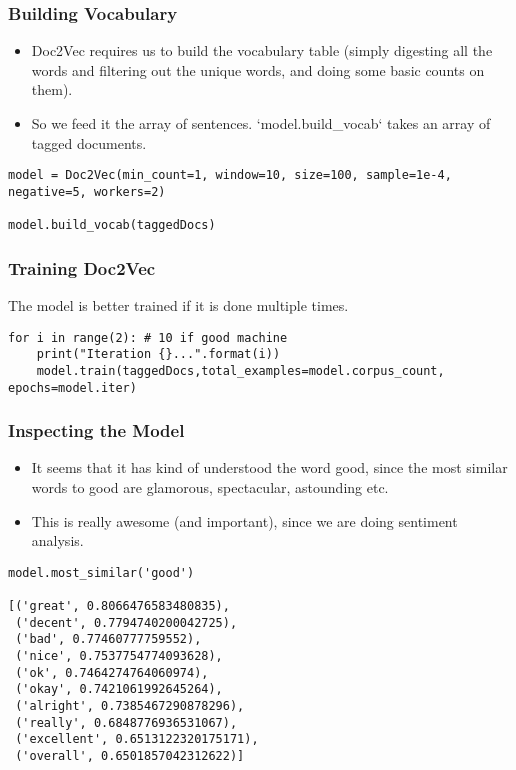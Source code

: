 \begin{frame}[fragile]\frametitle{Building Vocabulary}
\begin{itemize}
\item Doc2Vec requires us to build the vocabulary table (simply digesting all the words and filtering out the unique words, and doing some basic counts on them). 
\item So we feed it the array of sentences. `model.build\_vocab` takes an array of tagged documents.
\end{itemize}
\begin{lstlisting}
model = Doc2Vec(min_count=1, window=10, size=100, sample=1e-4, negative=5, workers=2)

model.build_vocab(taggedDocs)
\end{lstlisting}

\end{frame}


\begin{frame}[fragile]\frametitle{Training Doc2Vec}
The model is better trained if it is done multiple times. 
\begin{lstlisting}
for i in range(2): # 10 if good machine
    print("Iteration {}...".format(i))
    model.train(taggedDocs,total_examples=model.corpus_count, epochs=model.iter)
\end{lstlisting}
\end{frame}

\begin{frame}[fragile]\frametitle{Inspecting the Model}

\begin{itemize}
\item It seems that it has kind of understood the word good, since the most similar words to good are glamorous, spectacular, astounding etc. 
\item This is really awesome (and important), since we are doing sentiment analysis.
\end{itemize}

\begin{lstlisting}
model.most_similar('good')

[('great', 0.8066476583480835),
 ('decent', 0.7794740200042725),
 ('bad', 0.77460777759552),
 ('nice', 0.7537754774093628),
 ('ok', 0.7464274764060974),
 ('okay', 0.7421061992645264),
 ('alright', 0.7385467290878296),
 ('really', 0.6848776936531067),
 ('excellent', 0.6513122320175171),
 ('overall', 0.6501857042312622)]
\end{lstlisting}
\end{frame}


